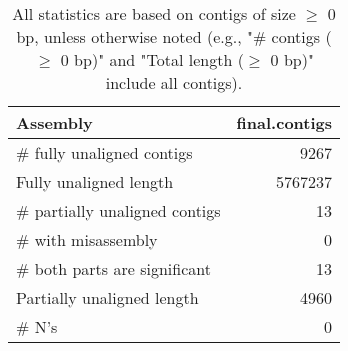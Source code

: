 \documentclass[12pt,a4paper]{article}
\begin{document}
\begin{table}[ht]
\begin{center}
\caption{All statistics are based on contigs of size $\geq$ 0 bp, unless otherwise noted (e.g., "\# contigs ($\geq$ 0 bp)" and "Total length ($\geq$ 0 bp)" include all contigs).}
\begin{tabular}{|l*{1}{|r}|}
\hline
Assembly & final.contigs \\ \hline
\# fully unaligned contigs & 9267 \\ \hline
Fully unaligned length & 5767237 \\ \hline
\# partially unaligned contigs & 13 \\ \hline
\hspace{5mm}\# with misassembly & 0 \\ \hline
\hspace{5mm}\# both parts are significant & 13 \\ \hline
Partially unaligned length & 4960 \\ \hline
\# N's & 0 \\ \hline
\end{tabular}
\end{center}
\end{table}
\end{document}
